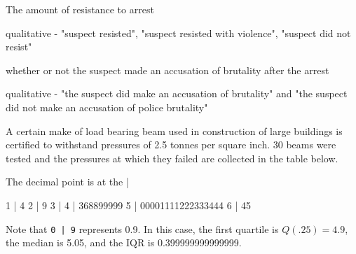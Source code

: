 \documentclass{examsetup}
\begin{document}
\begin{questions}
\begin{parts}
\begin{subparts}
      \subpart The amount of resistance to arrest
      \begin{solution}
         qualitative - "suspect resisted", "suspect resisted with violence", "suspect did not resist"
      \end{solution}

      \vspace{2cm}

      \subpart whether or not the suspect made an accusation of brutality after the arrest
      \begin{solution}
         qualitative - "the suspect did make an accusation of brutality" and "the suspect did not make an accusation of police brutality"
      \end{solution}

      \vspace{2cm}

   \end{subparts}

\end{parts}
\pagebreak

\question 


A certain make of load bearing beam used in construction of large buildings is certified to withstand pressures of 2.5 tonnes per square inch.
30 beams were tested and the pressures at which they failed are collected in the table below.

\begin{Schunk}
\begin{Soutput}
  The decimal point is at the |

  1 | 4
  2 | 9
  3 | 
  4 | 368899999
  5 | 00001111222333444
  6 | 45
\end{Soutput}
\end{Schunk}

Note that \verb!0 | 9! represents 0.9. In this case, the first quartile is $Q(.25) = 4.9$, the median is 5.05, and the IQR is 0.399999999999999.


\end{questions}
\end{document}
